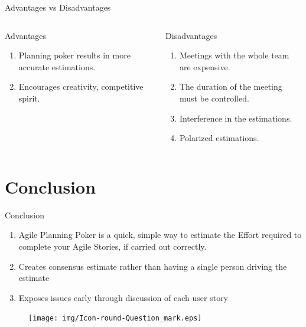 \documentclass[dvips,11pt,xcolor=dvipsnames]{beamer}
\numberwithin{table}{section}
\numberwithin{figure}{section} %
\begin{document}
\begin{frame}{Advantages vs Disadvantages}
\begin{columns}[t]
\begin{exampleblock}{Advantages}
\begin{enumerate}
.
      \item Planning poker results in more accurate estimations.
      \item Encourages creativity, competitive spirit.
      \end{enumerate}    
    \end{exampleblock}
    
    \begin{alertblock}{Disadvantages}
      \begin{enumerate}
      \item Meetings with the whole team are expensive.
      \item The duration of the meeting must be controlled.
      \item Interference in the estimations.
      \item Polarized estimations.
      \end{enumerate}    
    \end{alertblock}
    
    
  \end{columns}
\end{frame}

\section{Conclusion}


\begin{frame}{Conclusion}
  
  \begin{enumerate}
  \item Agile Planning Poker is a quick, simple way to estimate the Effort required to complete your Agile Stories, if carried out correctly. 
  \item Creates consensus estimate rather than having a single person driving the estimate
\item Exposes issues early through discussion of each user story
  \end{enumerate}    
  
\end{frame}

% 
% 
\begin{frame}{}
  \begin{figure}
    \begin{centering}
      \texttt{[image: img/Icon-round-Question\_mark.eps]}
      \par\end{centering}
  \end{figure}
\end{frame}
\end{document}
